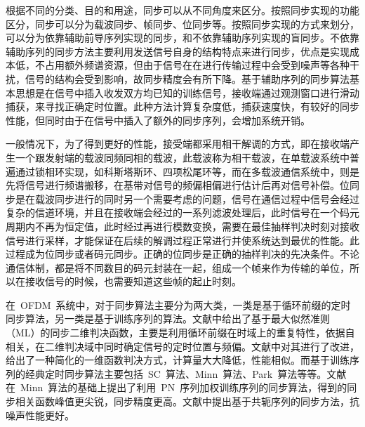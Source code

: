 根据不同的分类、目的和用途，同步可以从不同角度来区分。按照同步实现的功能区分，同步可以分为载波同步、帧同步、位同步等。按照同步实现的方式来划分，可以分为依靠辅助前导序列实现的同步，和不依靠辅助序列实现的盲同步。不依靠辅助序列的同步方法主要利用发送信号自身的结构特点来进行同步，优点是实现成本低，不占用额外频谱资源，但由于信号在在进行传输过程中会受到噪声等各种干扰，信号的结构会受到影响，故同步精度会有所下降。基于辅助序列的同步算法基本思想是在信号中插入收发双方均已知的训练信号，接收端通过观测窗口进行滑动捕获，来寻找正确定时位置。此种方法计算复杂度低，捕获速度快，有较好的同步性能，但同时由于在信号中插入了额外的同步序列，会增加系统开销。

一般情况下，为了得到更好的性能，接受端都采用相干解调的方式，即在接收端产生一个跟发射端的载波同频同相的载波，此载波称为相干载波，在单载波系统中普遍通过锁相环实现，如科斯塔斯环、四项松尾环等，而在多载波通信系统中，则是先将信号进行频谱搬移，在基带对信号的频偏相偏进行估计后再对信号补偿。位同步是在载波同步进行的同时另一个需要考虑的问题，信号在通信过程中信号会经过复杂的信道环境，并且在接收端会经过的一系列滤波处理后，此时信号在一个码元周期内不再为恒定值，此时经过再进行模数变换，需要在最佳抽样判决时刻对接收信号进行采样，才能保证在后续的解调过程正常进行并使系统达到最优的性能。此过程成为位同步或者码元同步。正确的位同步是正确的抽样判决的先决条件。不论通信体制，都是将不同数目的码元封装在一起，组成一个帧来作为传输的单位，所以在接收信号的时候，也需要知道这些帧的起止时刻。

在~OFDM~系统中，对于同步算法主要分为两大类，一类是基于循环前缀的定时同步算法，另一类是基于训练序列的算法。文献\cite{Jan1997ML}中给出了基于最大似然准则（ML）的同步二维判决函数，主要是利用循环前缀在时域上的重复特性，依据自相关，在二维判决域中同时确定信号的定时位置与频偏。文献\cite{chenneng2014}中对其进行了改进，给出了一种简化的一维函数判决方式，计算量大大降低，性能相似。而基于训练序列的经典定时同步算法主要包括~SC~算法、Minn~算法、Park~算法等等。文献\cite{shifeng2011}在~Minn~算法的基础上提出了利用~PN~序列加权训练序列的同步算法，得到的同步相关函数峰值更尖锐，同步精度更高。文献\cite{Ma2016Design}中提出基于共轭序列的同步方法，抗噪声性能更好。

